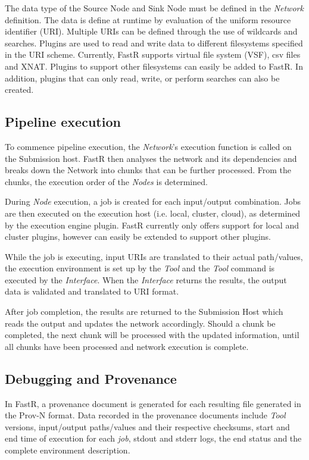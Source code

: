 \documentclass{report}
\begin{document}
The data type of the Source Node and Sink Node must be defined in the
\textit{Network} definition.  The data is define at runtime by evaluation of the
uniform resource identifier (URI). Multiple URIs can be defined through the use
of wildcards and searches. Plugins are used to read and write data to different
filesystems specified in the URI scheme. Currently, FastR supports virtual file
system (VSF), csv files and XNAT. Plugins to support other filesystems can
easily be added to FastR. In addition, plugins that can only read, write, or
perform searches can also be created.   


        \subsection{Pipeline execution} To commence pipeline execution, the
        \textit{Network}'s execution function is called on the Submission host.
        FastR then analyses the network and its dependencies and breaks down the
        Network into chunks that can be further processed. From the chunks, the
        execution order of the \textit{Nodes} is determined. 

During \textit{Node} execution, a job is created for each input/output
combination. Jobs are then executed on the execution host (i.e. local, cluster,
cloud), as determined by the execution engine plugin. FastR currently only
offers support for local and cluster plugins, however can easily be extended to
support other plugins. 

While the job is executing, input URIs are translated to their actual
path/values, the execution environment is set up by the \textit{Tool} and the
\textit{Tool} command is executed by the \textit{Interface}. When the
\textit{Interface} returns the results, the output data is validated and
translated to URI format. 

After job completion, the results are returned to the Submission Host which
reads the output and updates the network accordingly. Should a chunk be
completed, the next chunk will be processed with the updated information, until
all chunks have been processed and network execution is complete.

        \subsection{Debugging and Provenance} In FastR, a provenance document is
        generated for each resulting file generated in the Prov-N format. Data
        recorded in the provenance documents include \textit{Tool} versions,
        input/output paths/values and their respective checksums, start and end
        time of execution for each \textit{job}, stdout and stderr logs, the end
        status and the complete environment description.
\end{document}
